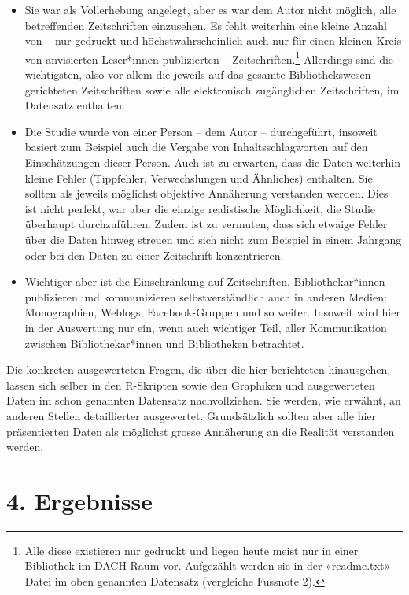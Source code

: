 \documentclass[a4paper,
fontsize=11pt,
oneside,
numbers=noperiodatend,
parskip=half-,
bibliography=totoc,
final
]{scrartcl}
\begin{document}
\begin{itemize}
\item
  Sie war als Vollerhebung angelegt, aber es war dem Autor nicht
  möglich, alle betreffenden Zeitschriften einzusehen. Es
  fehlt weiterhin eine kleine Anzahl von -- nur gedruckt
  und höchstwahrscheinlich auch nur für einen kleinen
  Kreis von anvisierten Leser*innen publizierten --
  Zeitschriften.\footnote{Alle diese existieren nur gedruckt und liegen
    heute meist nur in einer Bibliothek im DACH-Raum vor. Aufgezählt
    werden sie in der «readme.txt»-Datei im oben genannten Datensatz
    (vergleiche Fussnote 2).} Allerdings sind die
  wichtigsten, also vor allem die jeweils auf das gesamte
  Bibliothekswesen gerichteten Zeitschriften sowie alle 
  elektronisch zugänglichen Zeitschriften, im Datensatz enthalten.
\item
  Die Studie wurde von einer Person -- dem Autor -- durchgeführt,
  insoweit basiert zum Beispiel auch die Vergabe von
  Inhaltsschlagworten auf den Einschätzungen dieser
  Person. Auch ist zu erwarten, dass die Daten weiterhin
  kleine Fehler (Tippfehler, Verwechslungen und
  Ähnliches) enthalten. Sie sollten als jeweils möglichst
  objektive Annäherung verstanden werden. Dies ist nicht 
  perfekt, war aber die einzige realistische Möglichkeit, die Studie
  überhaupt durchzuführen. Zudem ist zu vermuten, dass
  sich etwaige Fehler über die Daten hinweg streuen und
  sich nicht zum Beispiel in einem Jahrgang oder bei den
  Daten zu einer Zeitschrift konzentrieren.
\item
  Wichtiger aber ist die Einschränkung auf Zeitschriften. 
  Bibliothekar*innen publizieren und kommunizieren
  selbstverständlich auch in anderen Medien: Monographien, Weblogs,\linebreak
  Facebook-Gruppen und so weiter. Insoweit wird hier in
  der Auswertung nur ein, wenn auch wichtiger Teil, aller
  Kommunikation zwischen Bibliothekar*innen und
  Bibliotheken betrachtet.
\end{itemize}

Die konkreten ausgewerteten Fragen, die über die hier berichteten
hinausgehen, lassen sich selber in den R-Skripten sowie den Graphiken
und ausgewerteten Daten im schon genannten Datensatz nachvollziehen. Sie
werden, wie erwähnt, an anderen Stellen detaillierter ausgewertet.
Grundsätzlich sollten aber alle hier präsentierten Daten als möglichst
grosse Annäherung an die Realität verstanden werden.

\hypertarget{ergebnisse}{%
\section{4. Ergebnisse}\label{ergebnisse}}
\end{document}
